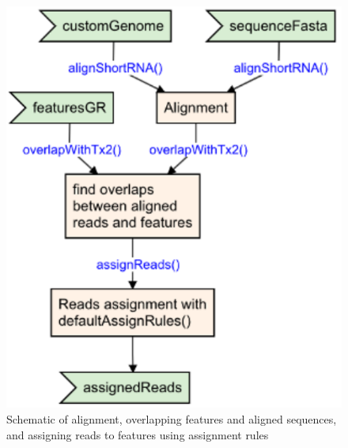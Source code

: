\documentclass[12pt,twoside]{reedthesis}
\begin{document}
\begin{figure}[H]

{\centering \includegraphics{thesis_files/figure-latex/3f7-1} 

}

\caption{Schematic of alignment, overlapping features and aligned sequences, and assigning reads to features using assignment rules}\label{fig:3f7}
\end{figure}
\end{document}
